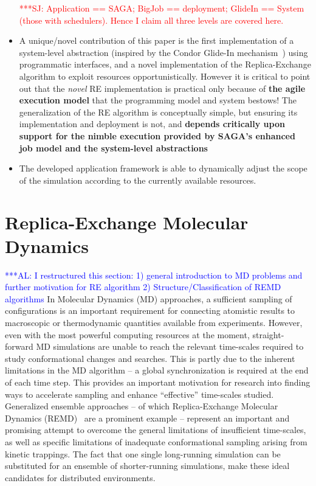 \documentclass{rspublic}
\newcommand{\alnote}[1]{ {\textcolor{blue} { ***AL: #1 }}}
\newcommand{\jhanote}[1]{ {\textcolor{red} { ***SJ: #1 }}}
\newcommand{\alnote}[1]{}
\newcommand{\jhanote}[1]{}
\begin{document}
\begin{itemize}
   \jhanote{Application == SAGA; BigJob == deployment; GlideIn ==
      System (those with schedulers). Hence I claim all three levels
      are covered here.}

  \item A unique/novel contribution of this paper is the first
    implementation of a system-level abstraction (inspired by the Condor
    Glide-In mechanism~\citep{citeulike:291860}) using programmatic
    interfaces, and a novel implementation of the Replica-Exchange
    algorithm to exploit resources opportunistically.  However it is
    critical to point out that the {\it novel} RE implementation is
    practical only because of {\bf the agile execution model} that the
    programming model and system bestows! The generalization of the RE
    algorithm is conceptually simple, but ensuring its implementation
    and deployment is not, and {\bf depends critically upon support for
      the nimble execution provided by SAGA's enhanced job model and the
      system-level abstractions}

  \item The developed application framework is able to dynamically
    adjust the scope of the simulation according to the currently
    available resources.

\end{itemize}
\fi

\section{Replica-Exchange Molecular Dynamics}
\alnote{I restructured this section: 1) general introduction to MD
  problems and further motivation for RE algorithm 2)
  Structure/Classification of REMD algorithms}  In Molecular
Dynamics (MD) approaches, a sufficient sampling of configurations is
an important requirement for connecting atomistic results to
macroscopic or thermodynamic quantities available from experiments.
However, even with the most powerful computing resources at the
moment, straight-forward MD simulations are unable to reach the
relevant time-scales required to study conformational changes and
searches. This is partly due to the inherent limitations in the MD
algorithm -- a global synchronization is required at the end of each
time step.  This provides an important motivation for research into
finding ways to accelerate sampling and enhance ``effective''
time-scales studied. Generalized ensemble approaches -- of which
Replica-Exchange Molecular Dynamics (REMD)~\citep{Sugita:1999rm} are a
prominent example -- represent an important and promising attempt to
overcome the general limitations of insufficient time-scales, as well
as specific limitations of inadequate conformational sampling arising
from kinetic trappings.  The fact that one single long-running
simulation can be substituted for an ensemble of shorter-running
simulations, make these ideal candidates for distributed environments.
\end{document}
